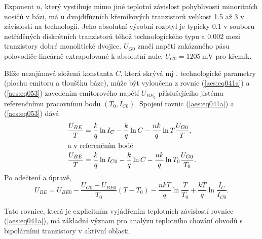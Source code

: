         Exponent \(n\), který vystihuje mimo jiné teplotní závislost pohyblivosti minoritních nosičů
        v bázi, má u dvojdifúzních křemíkových tranzistorů velikost \num{1.5} až 3 v závislosti na
        technologii. Jeho absolutní výrobní rozptyl je typicky \num{0.1} v souboru netříděných
        diskrétních tranzistorů téhož technologického typu a \num{0.002} mezi tranzistory dobré
        monolitické dvojice. \(U_{G0}\) značí napětí zakázaného pásu polovodiče lineárně
        extrapolované k absolutní nule, \(U_{G0} = \SI{1205}{\mV}\) pro křemík.

        Blíže nezajímavá složená konstanta \(C\), která skrývá mj . technologické parametry (plochu
        emitoru a tloušťku báze), může být vyloučena z rovnic (\ref{aes:eq041a}) a (\ref{aes:eq053})
        zavedením emitorového napětí \(U_{BE_0}\) příslušejícího jistému referenčnímu pracovnímu
        bodu \((T_0, I_{C0})\). Spojení rovnic (\ref{aes:eq041a}) a (\ref{aes:eq053}) dává
        \begin{align*}
          \dfrac{U_{BE}}{T} &= \dfrac{k}{q}\ln{I_C} - \dfrac{k}{q}\ln{C} - \dfrac{nk}{q}\ln{T}
                               \dfrac{U_{G0}}{T},   \\
          \shortintertext{a v referenčním bodě}
          \dfrac{U_{BE}}{T} &= \dfrac{k}{q}\ln{I_{C0}} - \dfrac{k}{q}\ln{C} - \dfrac{nk}{q}\ln{T_0}
                               \dfrac{U_{G0}}{T_0}. 
        \end{align*}
        Po odečtení a úpravě,
        \begin{equation}\label{aes:eq054}
          U_{BE} = U_{BE0} - \dfrac{U_{G0} - U_{BE0}}{T_0}(T - T_0) - 
                   \dfrac{nkT}{q}\ln\dfrac{T}{T_0} + \dfrac{kT}{q}\ln\dfrac{I_C}{I_{C0}}.
        \end{equation}

        Tato rovnice, která je explicitním vyjádřením teplotních závislostí rovnice
        (\ref{aes:eq041a}), má základní význam pro analýzu teplotního chování obvodů s bipolárními
        tranzistory v aktivní oblasti.

